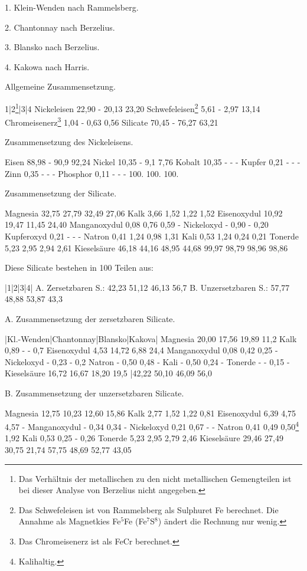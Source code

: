 \documentclass[a4paper, 11pt, oneside]{article}
\begin{document}
1. Klein-Wenden nach Rammelsberg.

2. Chantonnay nach Berzelius.

3. Blansko nach Berzelius.

4. Kakowa nach Harris.

Allgemeine Zusammensetzung.

1|2\footnote{Das Verhältnis der metallischen zu den nicht metallischen Gemengteilen ist bei dieser Analyse von Berzelius nicht angegeben.}|3|4  
Nickeleisen 22,90 - 20,13 23,20  
Schwefeleisen\footnote{Das Schwefeleisen ist von Rammelsberg als Sulphuret Fe berechnet. Die Annahme als Magnetkies Fe$^{5}$Fe (Fe$^{7}$S$^{8}$) ändert die Rechnung nur wenig.} 5,61 - 2,97 13,14  
Chromeisenerz\footnote{Das Chromeisenerz ist als FeCr berechnet.} 1,04 - 0,63 0,56  
Silicate 70,45 - 76,27 63,21

Zusammensetzung des Nickeleisens.

Eisen 88,98 - 90,9 92,24  
Nickel 10,35 - 9,1 7,76  
Kobalt 10,35 - - -  
Kupfer 0,21 - - -  
Zinn 0,35 - - -  
Phosphor 0,11 - - -  
100. 100. 100.

Zusammensetzung der Silicate.

Magnesia 32,75 27,79 32,49 27,06  
Kalk 3,66 1,52 1,22 1,52  
Eisenoxydul 10,92 19,47 11,45 24,40  
Manganoxydul 0,08 0,76 0,59 -  
Nickeloxyd - 0,90 - 0,20  
Kupferoxyd 0,21 - - -  
Natron 0,41 1,24 0,98 1,31
Kali 0,53 1,24 0,24 0,21  
Tonerde 5,23 2,95 2,94 2,61  
Kieselsäure 46,18 44,16 48,95 44,68  
99,97 98,79 98,96 98,86

Diese Silicate bestehen in 100 Teilen aus:

|1|2|3|4| 
A. Zersetzbaren S.: 42,23 51,12 46,13 56,7  
B. Unzersetzbaren S.: 57,77 48,88 53,87 43,3

A. Zusammensetzung der zersetzbaren Silicate.

|Kl.-Wenden|Chantonnay|Blansko|Kakova|  
Magnesia 20,00 17,56 19,89 11,2  
Kalk 0,89 - - 0,7  
Eisenoxydul 4,53 14,72 6,88 24,4  
Manganoxydul 0,08 0,42 0,25 -  
Nickeloxyd - 0,23 - 0,2  
Natron - 0,50 0,48 -  
Kali - 0,50 0,24 -  
Tonerde - - 0,15 -  
Kieselsäure 16,72 16,67 18,20 19,5  
|42,22 50,10 46,09 56,0

B. Zusammensetzung der unzersetzbaren Silicate.

Magnesia 12,75 10,23 12,60 15,86  
Kalk 2,77 1,52 1,22 0,81  
Eisenoxydul 6,39 4,75 4,57 -  
Manganoxydul - 0,34 0,34 -  
Nickeloxyd 0,21 0,67 - -  
Natron 0,41 0,49 0,50\footnote{Kalihaltig.} 1,92  
Kali 0,53 0,25 - 0,26  
Tonerde 5,23 2,95 2,79 2,46  
Kieselsäure 29,46 27,49 30,75 21,74  
57,75 48,69 52,77 43,05
\end{document}
